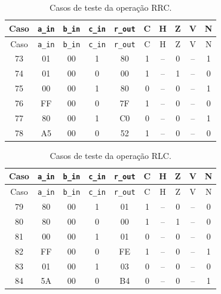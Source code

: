 \begin{longtable}{c c c c c c c c c c}
\caption{Casos de teste da operação RRC.}
\label{tab:testes-RRC}\\
\hline
Caso & \texttt{a\_in} & \texttt{b\_in} & \texttt{c\_in} & \texttt{r\_out} & C & H & Z & V & N \\ \hline
\endfirsthead
\hline
Caso & \texttt{a\_in} & \texttt{b\_in} & \texttt{c\_in} & \texttt{r\_out} & C & H & Z & V & N \\ \hline
\endhead
73 & 01 & 00 & 1 & 80 & 1 & {\footnotesize--} & 0 & {\footnotesize--} & 1 \\
74 & 01 & 00 & 0 & 00 & 1 & {\footnotesize--} & 1 & {\footnotesize--} & 0 \\
75 & 00 & 00 & 1 & 80 & 0 & {\footnotesize--} & 0 & {\footnotesize--} & 1 \\
76 & FF & 00 & 0 & 7F & 1 & {\footnotesize--} & 0 & {\footnotesize--} & 0 \\
77 & 80 & 00 & 1 & C0 & 0 & {\footnotesize--} & 0 & {\footnotesize--} & 1 \\
78 & A5 & 00 & 0 & 52 & 1 & {\footnotesize--} & 0 & {\footnotesize--} & 0 \\
\hline
\end{longtable}
\vspace{-0.5cm}

\begin{longtable}{c c c c c c c c c c}
\caption{Casos de teste da operação RLC.}
\label{tab:testes-RLC}\\
\hline
Caso & \texttt{a\_in} & \texttt{b\_in} & \texttt{c\_in} & \texttt{r\_out} & C & H & Z & V & N \\ \hline
\endfirsthead
\hline
Caso & \texttt{a\_in} & \texttt{b\_in} & \texttt{c\_in} & \texttt{r\_out} & C & H & Z & V & N \\ \hline
\endhead
79 & 80 & 00 & 1 & 01 & 1 & {\footnotesize--} & 0 & {\footnotesize--} & 0 \\
80 & 80 & 00 & 0 & 00 & 1 & {\footnotesize--} & 1 & {\footnotesize--} & 0 \\
81 & 00 & 00 & 1 & 01 & 0 & {\footnotesize--} & 0 & {\footnotesize--} & 0 \\
82 & FF & 00 & 0 & FE & 1 & {\footnotesize--} & 0 & {\footnotesize--} & 1 \\
83 & 01 & 00 & 1 & 03 & 0 & {\footnotesize--} & 0 & {\footnotesize--} & 0 \\
84 & 5A & 00 & 0 & B4 & 0 & {\footnotesize--} & 0 & {\footnotesize--} & 1 \\
\hline
\end{longtable}
\vspace{-0.5cm}

